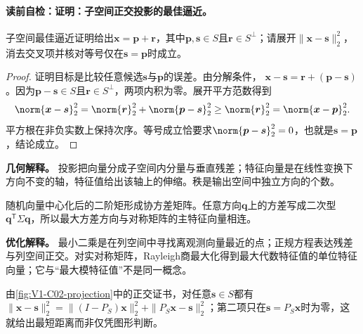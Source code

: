 \paragraph{读前自检：证明：子空间正交投影的最佳逼近。}子空间最佳逼近证明给出$\boldsymbol{x}=\boldsymbol p+\boldsymbol r$，其中$\boldsymbol p,\boldsymbol s\in S$且$\boldsymbol r\in S^\perp$；请展开$\lVert\boldsymbol{x}-\boldsymbol s\rVert_2^2$，消去交叉项并核对等号仅在$\boldsymbol s=\boldsymbol p$时成立。\par

\begin{proof}\label{schema:V1-C02:CH-13}
证明目标是比较任意候选$\boldsymbol{s}$与$\boldsymbol{p}$的误差。由分解条件，
$\boldsymbol{x}-\boldsymbol{s}=\boldsymbol{r}+(\boldsymbol{p}-\boldsymbol{s})$。因为$\boldsymbol{p}-\boldsymbol{s}\in S$且$\boldsymbol{r}\in S^{\perp}$，两项内积为零。展开平方范数得到
\[
\norm{\boldsymbol{x}-\boldsymbol{s}}_2^2
=\norm{\boldsymbol{r}}_2^2+\norm{\boldsymbol{p}-\boldsymbol{s}}_2^2
\ge \norm{\boldsymbol{r}}_2^2
=\norm{\boldsymbol{x}-\boldsymbol{p}}_2^2.
\]
平方根在非负实数上保持次序。等号成立恰要求$\norm{\boldsymbol{p}-\boldsymbol{s}}_2^2=0$，也就是$\boldsymbol{s}=\boldsymbol{p}$，结论成立。
\end{proof}

\begin{geometrybox}\label{schema:V1-C02:CH-14}
\textbf{几何解释。} 投影把向量分成子空间内分量与垂直残差；特征向量是在线性变换下方向不变的轴，特征值给出该轴上的伸缩。秩是输出空间中独立方向的个数。
\end{geometrybox}
\begin{probabilitybox}\label{schema:V1-C02:CH-15}
随机向量中心化后的二阶矩形成协方差矩阵。任意方向$\boldsymbol{q}$上的方差写成二次型$\boldsymbol{q}^{\mathsf T}\Sigma\boldsymbol{q}$，所以最大方差方向与对称矩阵的主特征向量相连。
\end{probabilitybox}
\begin{optimizationbox}\label{schema:V1-C02:CH-16}
\textbf{优化解释。} 最小二乘是在列空间中寻找离观测向量最近的点；正规方程表达残差与列空间正交。对实对称矩阵，Rayleigh商最大化得到最大代数特征值的单位特征向量；它与“最大模特征值”不是同一概念。
\end{optimizationbox}


由\cref{fig:V1-C02-projection}中的正交证书，对任意$\boldsymbol s\in S$都有
$\|\boldsymbol x-\boldsymbol s\|_2^2=\|(I-P_S)\boldsymbol x\|_2^2+\|P_S\boldsymbol x-\boldsymbol s\|_2^2$；第二项只在$\boldsymbol s=P_S\boldsymbol x$时为零，这就给出最短距离而非仅凭图形判断。

